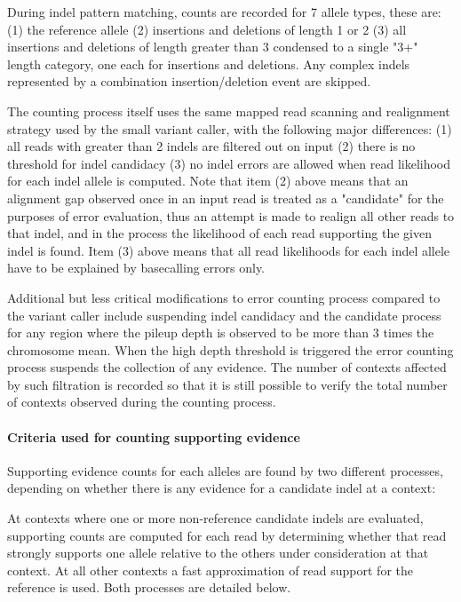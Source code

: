 \documentclass{article}
\begin{document}
During indel pattern matching, counts are recorded for 7 allele types, these are: (1) the reference allele (2) insertions and deletions of length 1 or 2 (3) all insertions and deletions of length greater than 3 condensed to a single "3+" length category, one each for insertions and deletions. Any complex indels represented by a combination insertion/deletion event are skipped.

The counting process itself uses the same mapped read scanning and realignment strategy used by the small variant caller, with the following major differences: (1) all reads with greater than 2 indels are filtered out on input (2) there is no threshold for indel candidacy (3) no indel errors are allowed when read likelihood for each indel allele is computed. Note that item (2) above means that an alignment gap  observed once in an input read is treated as a "candidate" for the purposes of error evaluation, thus an attempt is made to realign all other reads to that indel, and in the process the likelihood of each read supporting the given indel is found. Item (3) above means that all read likelihoods for each indel allele have to be explained by basecalling errors only.

Additional but less critical modifications to error counting process compared to the variant caller include suspending indel candidacy and the candidate process for any region where the pileup depth is observed to be more than 3 times the chromosome mean. When the high depth threshold is triggered the error counting process suspends the collection of any evidence. The number of contexts affected by such filtration is recorded so that it is still possible to verify the total number of contexts observed during the counting process.

\paragraph{Criteria used for counting supporting evidence}

Supporting evidence counts for each alleles are found by two different processes, depending on whether there is any evidence for a candidate indel at a context:

At contexts where one or more non-reference candidate indels are evaluated, supporting counts are computed for each read by determining whether that read strongly supports one allele relative to the others under consideration at that context. At all other contexts a fast approximation of read support for the reference is used. Both processes are detailed below.
\end{document}
